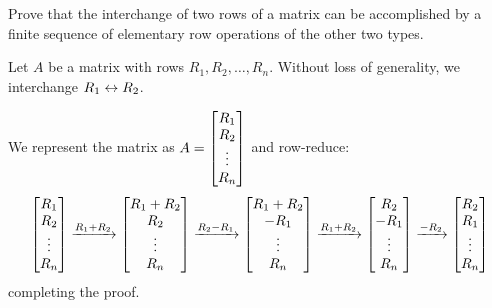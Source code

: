 \begin{xca}
  Prove that the interchange of two rows of a matrix can be accomplished by
  a finite sequence of elementary row operations of the other two types.
\end{xca}
\begin{prf}
  Let $A$ be a matrix with rows $R_1, R_2, \dotsc, R_n$.
  Without loss of generality, we interchange $R_1 \leftrightarrow R_2$.

  We represent the matrix as $A = \begin{bmatrix}R_1 \\ R_2 \\ \vdots \\ R_n\end{bmatrix}$ and row-reduce:
  \begin{equation*}
    \begin{bmatrix}R_1 \\ R_2 \\ \vdots \\ R_n\end{bmatrix}
    \xrightarrow{R_1 + R_2} \begin{bmatrix}R_1 + R_2 \\ R_2 \\ \vdots \\ R_n\end{bmatrix}
    \xrightarrow{R_2 - R_1} \begin{bmatrix}R_1 + R_2 \\ -R_1 \\ \vdots \\ R_n\end{bmatrix}
    \xrightarrow{R_1 + R_2} \begin{bmatrix}R_2 \\ -R_1 \\ \vdots \\ R_n\end{bmatrix}
    \xrightarrow{-R_2} \begin{bmatrix}R_2 \\ R_1 \\ \vdots \\ R_n\end{bmatrix}
  \end{equation*}
  completing the proof.
\end{prf}

